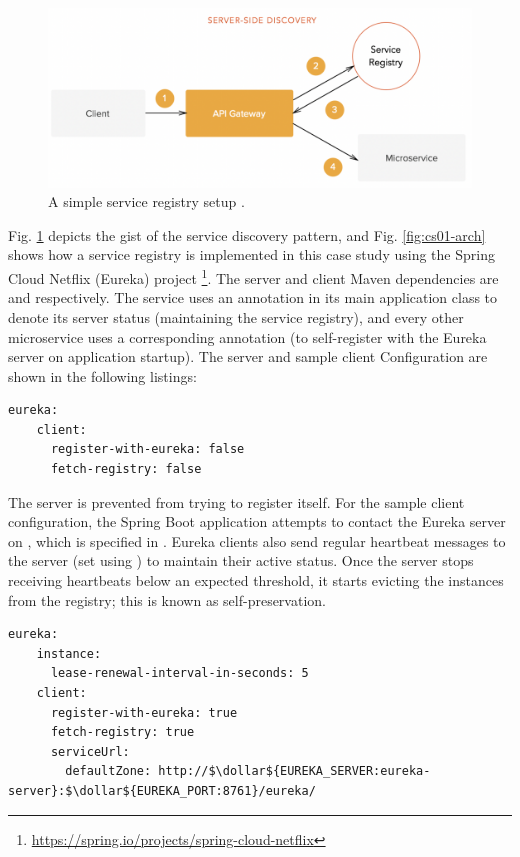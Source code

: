 \begin{figure}[H]
  \centering
  \includegraphics[width=0.7\linewidth]{./assets/images/case-studies/server-side-discovery.png}
  \caption{A simple service registry setup \cite{peyrott15}.}
  \label{fig:server-side-discovery}
\end{figure}

Fig. \ref{fig:server-side-discovery} depicts the gist of the service discovery pattern, and Fig. \ref{fig:cs01-arch} shows how a service registry is implemented in this case study using the Spring Cloud Netflix (Eureka) project \footnote{\url{https://spring.io/projects/spring-cloud-netflix}}. The server and client Maven dependencies are  and  respectively. The  service uses an  annotation in its main application class to denote its server status (maintaining the service registry), and every other microservice uses a corresponding  annotation (to self-register with the Eureka server on application startup). The server and sample client Configuration are shown in the following listings:

\begin{lstlisting}[caption=Snippet from Eureka server's application properties]
  eureka:
    client:
      register-with-eureka: false
      fetch-registry: false
\end{lstlisting}

The server is prevented from trying to register itself. For the sample client configuration, the Spring Boot application attempts to contact the Eureka server on , which is specified in . Eureka clients also send regular heartbeat messages to the server (set using ) to maintain their active status. Once the server stops receiving heartbeats below an expected threshold, it starts evicting the instances from the registry; this is known as self-preservation.

\begin{lstlisting}[caption=Snippet from a Eureka client's application properties]
  eureka:
    instance:
      lease-renewal-interval-in-seconds: 5
    client:
      register-with-eureka: true
      fetch-registry: true
      serviceUrl:
        defaultZone: http://$\dollar${EUREKA_SERVER:eureka-server}:$\dollar${EUREKA_PORT:8761}/eureka/
\end{lstlisting}

